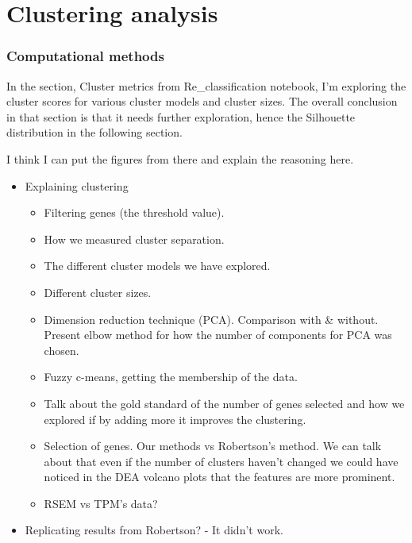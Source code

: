 
\section{Clustering analysis} \label{s:clustering_analysis}

\subsubsection{Computational methods}

In the section, Cluster metrics from Re\_classification notebook, I'm exploring the cluster scores for various cluster models and cluster sizes. The overall conclusion in that section is that it needs further exploration, hence the Silhouette distribution in the following section.

I think I can put the figures from there and explain the reasoning here.

\begin{itemize}
    \item Explaining clustering
        \begin{itemize}
            \item Filtering genes (the threshold value).
            \item How we measured cluster separation.
            \item The different cluster models we have explored. 
            \item Different cluster sizes.
            \item Dimension reduction technique (PCA). Comparison with \& without. Present elbow method for how the number of components for PCA was chosen.
            \item Fuzzy c-means, getting the membership of the data.
            \item Talk about the gold standard of the number of genes selected and how we explored if by adding more it improves the clustering.
            \item Selection of genes. Our methods vs Robertson's method. We can talk about that even if the number of clusters haven't changed we could have noticed in the DEA volcano plots that the features are more prominent.
            \item RSEM vs TPM's data?
        \end{itemize}
    \item Replicating results from Robertson? - It didn't work.
\end{itemize}




